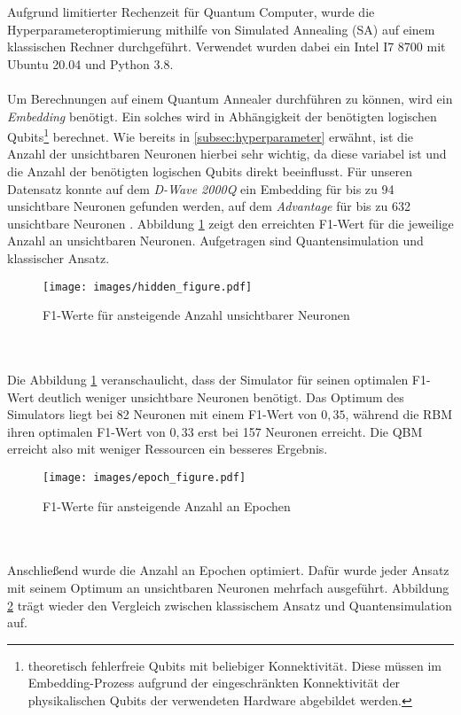 Aufgrund limitierter Rechenzeit für Quantum Computer, wurde die Hyperparameteroptimierung
mithilfe von Simulated Annealing (SA) auf einem klassischen Rechner durchgeführt. Verwendet wurden 
dabei ein Intel I7 8700 mit Ubuntu 20.04 und Python 3.8.\\\\
Um Berechnungen auf einem Quantum Annealer durchführen zu können, wird ein \emph{Embedding} benötigt. Ein
solches wird in Abhängigkeit der benötigten logischen Qubits\footnote{theoretisch fehlerfreie Qubits mit beliebiger Konnektivität. Diese müssen im Embedding-Prozess aufgrund der eingeschränkten Konnektivität der physikalischen Qubits der verwendeten Hardware abgebildet werden.} 
berechnet. Wie bereits in \ref{subsec:hyperparameter} erwähnt, ist die Anzahl der unsichtbaren Neuronen hierbei sehr 
wichtig, da diese variabel ist und die Anzahl der benötigten logischen Qubits direkt
beeinflusst. Für unseren Datensatz konnte auf dem
\emph{D-Wave 2000Q} ein Embedding für bis zu 94 unsichtbare Neuronen gefunden werden, auf dem
\emph{Advantage} für bis zu 632 unsichtbare Neuronen \cite{quantum_hardware}. Abbildung \ref{fig:hidden_units} zeigt
den erreichten F1-Wert für die jeweilige Anzahl an unsichtbaren Neuronen. Aufgetragen 
sind Quantensimulation und klassischer Ansatz.
\begin{figure}[h!]
    \centering
    \texttt{[image: images/hidden\_figure.pdf]}
    \caption{F1-Werte für ansteigende Anzahl unsichtbarer Neuronen}
    \label{fig:hidden_units}
\end{figure}\\\\
Die Abbildung \ref{fig:hidden_units} veranschaulicht, dass der Simulator für seinen optimalen F1-Wert deutlich weniger 
unsichtbare Neuronen benötigt. Das Optimum des Simulators liegt bei 82 Neuronen mit einem F1-Wert von $0,35$, während die RBM 
ihren optimalen F1-Wert von $0,33$ erst bei 157 Neuronen erreicht.
Die QBM erreicht also mit weniger Ressourcen ein besseres Ergebnis.
\begin{figure}[h!]
    \centering
    \texttt{[image: images/epoch\_figure.pdf]}
    \caption{F1-Werte für ansteigende Anzahl an Epochen}
    \label{fig:epochs}
\end{figure}\\\\
Anschließend wurde die Anzahl an Epochen optimiert. Dafür wurde jeder Ansatz mit seinem
Optimum an unsichtbaren Neuronen mehrfach ausgeführt. Abbildung \ref{fig:epochs} trägt
wieder den Vergleich zwischen klassischem Ansatz und Quantensimulation auf.
